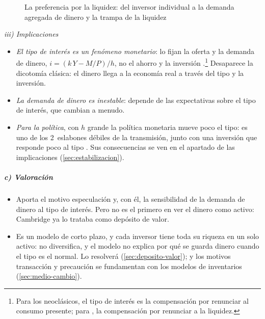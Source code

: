 \documentclass[11pt]{article}
\begin{document}
\begin{figure}[H]
\centering
\caption{La preferencia por la liquidez: del inversor individual a la demanda agregada de dinero y la trampa de la liquidez}\label{fig:liquidez}
\end{figure}

\hspace*{3.6em}\emph{iii) Implicaciones}

\begin{itemize}
\item \emph{El tipo de interés es un fenómeno monetario}: lo fijan la oferta y la demanda de dinero, $i=(k\,Y-M/P)/h$, no el ahorro y la inversión .\footnote{Para los neoclásicos, el tipo de interés es la compensación por renunciar al consumo presente; para , la compensación por renunciar a la liquidez.} Desaparece la dicotomía clásica: el dinero llega a la economía real a través del tipo y la inversión.
\item \emph{La demanda de dinero es inestable}: depende de las expectativas sobre el tipo de interés, que cambian a menudo.
\item \emph{Para la política}, con $h$ grande la política monetaria mueve poco el tipo: es uno de los 2~eslabones débiles de la transmisión, junto con una inversión que responde poco al tipo . Sus consecuencias se ven en el apartado de las implicaciones (\ref{sec:estabilizacion}).
\end{itemize}

\subparagraph{c) Valoración}

\begin{itemize}
\item Aporta el motivo especulación y, con él, la sensibilidad de la demanda de dinero al tipo de interés. Pero  no es el primero en ver el dinero como activo: Cambridge ya lo trataba como depósito de valor.
\item Es un modelo de corto plazo, y cada inversor tiene toda su riqueza en un solo activo: no diversifica, y el modelo no explica por qué se guarda dinero cuando el tipo es el normal. Lo resolverá \textcite{Tobin1958Liquidity} (\ref{sec:deposito-valor}); y los motivos transacción y precaución se fundamentan con los modelos de inventarios (\ref{sec:medio-cambio}).
\end{itemize}
\end{document}
